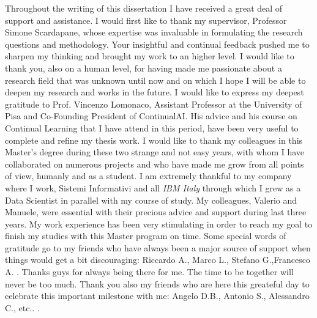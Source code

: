 \documentclass[english, LaM, oneside]{sapthesis}%
\begin{document}
\begin{acknowledgments}
\vspace{7mm}

\lettrine[lines=2, findent=3pt, nindent=0pt]{T}{}hroughout the writing of this dissertation I have received a great deal of support and assistance.
\newline \newline
I would first like to thank my supervisor, Professor Simone Scardapane, whose expertise was invaluable in formulating the research questions and methodology. Your insightful and continual feedback pushed me to sharpen my thinking and brought my work to an higher level.  I would like to thank you, also on a human level, for having made me passionate about a research field that was unknown until now and on which I hope I will be able to deepen my research and works in the future.
\newline \newline
I would like to express my deepest gratitude to Prof. Vincenzo Lomonaco, Assistant Professor at the University of Pisa and Co-Founding President of ContinualAI. His advice and his course on Continual Learning that I have attend in this period, have been very useful to complete and refine my thesis work. 
\newline \newline
I would like to thank my colleagues in this Master's degree during these two strange and not easy years, with whom I have collaborated on numerous projects and who have made me grow from all points of view, humanly and as a student.
\newline \newline
I am extremely thankful to my company where I work, Sistemi Informativi and all \textit{IBM Italy} through which I grew as a Data Scientist in parallel with my course of study. My colleagues, Valerio and Manuele, were essential with their precious advice and support during last three years. My work experience has been very stimulating in order to reach my goal to finish my studies with this Master program on time.
\newline \newline
Some special words of gratitude go to my friends who have always been a major source of support when things would get a bit discouraging: Riccardo A., Marco L., Stefano G.,Francesco A. . Thanks guys for always being there for me. The time to be together will never be too much. \newline
Thank you also my friends who are here this greateful day to celebrate this important milestone with me: Angelo D.B., Antonio S., Alessandro C., etc.. .

\end{acknowledgments}
\end{document}
